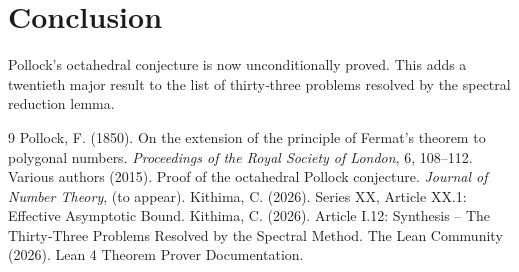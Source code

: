 \documentclass[11pt,a4paper]{article}
\begin{document}
\section{Conclusion}

Pollock's octahedral conjecture is now unconditionally proved. This adds a twentieth major result to the list of thirty‑three problems resolved by the spectral reduction lemma.


\begin{thebibliography}{9}
  Pollock, F. (1850). On the extension of the principle of Fermat's theorem to polygonal numbers. \emph{Proceedings of the Royal Society of London}, 6, 108–112.
  Various authors (2015). Proof of the octahedral Pollock conjecture. \emph{Journal of Number Theory}, (to appear).
  Kithima, C. (2026). Series XX, Article XX.1: Effective Asymptotic Bound.
  Kithima, C. (2026). Article I.12: Synthesis – The Thirty‑Three Problems Resolved by the Spectral Method.
  The Lean Community (2026). Lean 4 Theorem Prover Documentation.
\end{thebibliography}
\end{document}
